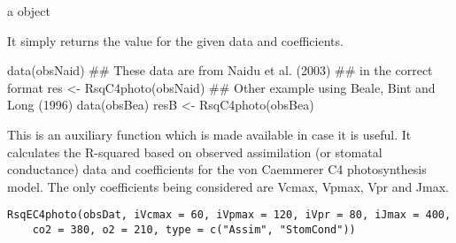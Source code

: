 \documentclass[letterpaper]{book}
\begin{document}
%
\begin{Value}
a  object

It simply returns the  value for the given data
and coefficients.
\end{Value}
%
\begin{Examples}
\begin{ExampleCode}
data(obsNaid)
## These data are from Naidu et al. (2003)
## in the correct format
res <- RsqC4photo(obsNaid)
## Other example using Beale, Bint and Long (1996)
data(obsBea)
resB <- RsqC4photo(obsBea)
\end{ExampleCode}
\end{Examples}
%
\begin{Description}\relax
This is an auxiliary function which is made available in case it is
useful. It calculates the R-squared based on observed assimilation (or
stomatal conductance) data and coefficients for the von Caemmerer C4
photosynthesis model. The only coefficients being considered are
Vcmax, Vpmax, Vpr and Jmax. 

\end{Description}
%
\begin{Usage}
\begin{verbatim}
RsqEC4photo(obsDat, iVcmax = 60, iVpmax = 120, iVpr = 80, iJmax = 400, 
    co2 = 380, o2 = 210, type = c("Assim", "StomCond"))
\end{verbatim}
\end{Usage}
%
\end{document}
